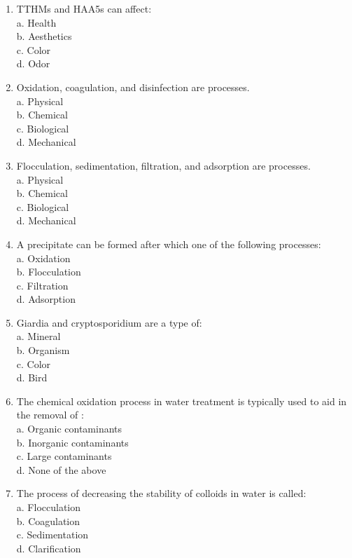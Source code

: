 \begin{enumerate}
\item TTHMs and HAA5s can affect:\\
a. Health\\
b. Aesthetics\\
c. Color\\
d. Odor\\
\item Oxidation, coagulation, and disinfection are processes.\\
a. Physical\\
b. Chemical\\
c. Biological\\
d. Mechanical\\
\item Flocculation, sedimentation, filtration, and adsorption are processes.\\
a. Physical\\
b. Chemical\\
c. Biological\\
d. Mechanical\\
\item A precipitate can be formed after which one of the following processes:\\
a. Oxidation\\
b. Flocculation\\
c. Filtration\\
d. Adsorption\\
\item Giardia and cryptosporidium are a type of:\\
a. Mineral\\
b. Organism\\
c. Color\\
d. Bird\\
\item The chemical oxidation process in water treatment is typically used to aid in the removal of :\\
a. Organic contaminants\\
b. Inorganic contaminants\\
c. Large contaminants\\
d. None of the above\\
\item The process of decreasing the stability of colloids in water is called:\\
a. Flocculation\\
b. Coagulation\\
c. Sedimentation\\
d. Clarification\\

\end{enumerate}
